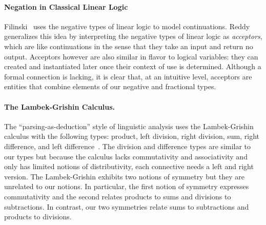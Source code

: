 \documentclass[preprint]{sigplanconf}
\begin{document}
{\paragraph*{Negation in Classical Linear Logic} 
Filinski~\cite{Filinski92} uses the negative types of linear logic to model
continuations. Reddy~\cite{Reddy91} generalizes this idea by interpreting the
negative types of linear logic as \emph{acceptors}, which are like
continuations in the sense that they take an input and return no
output. Acceptors however are also similar in flavor to logical variables:
they can created and instantiated later once their context of use is
determined. Although a formal connection is lacking, it is clear that, at an
intuitive level, acceptors are entities that combine elements of our negative
and fractional types.

\paragraph*{The Lambek-Grishin Calculus.} The ``parsing-as-deduction'' style
of linguistic analysis uses the Lambek-Grishin calculus with the following
types: product, left division, right division, sum, right difference, and
left difference~\cite{Bernardi:2010:CSL:1749618.1749689}. The division and
difference types are similar to our types but because the calculus lacks
commutativity and associativity and only has limited notions of
distributivity, each connective needs a left and right version. The
Lambek-Grishin exhibits two notions of symmetry but they are unrelated to our
notions. In particular, the first notion of symmetry expresses commutativity
and the second relates products to sums and divisions to subtractions. In
contrast, our two symmetries relate sums to subtractions and products to
divisions.

}
\end{document}
